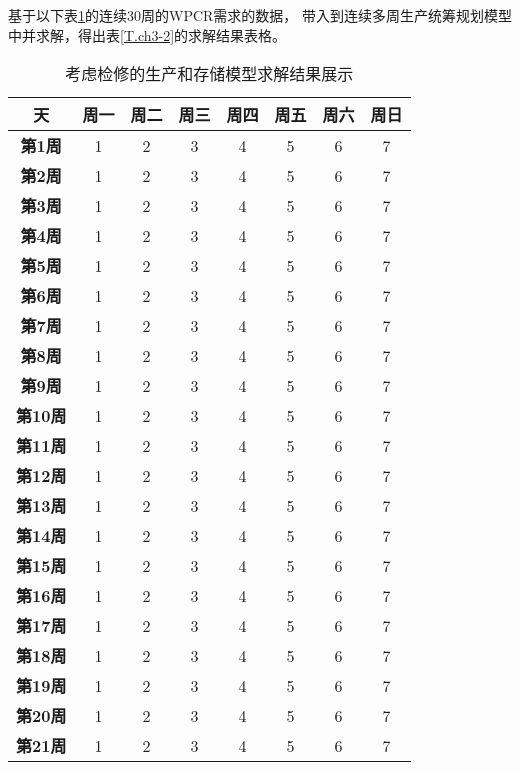 基于以下表\ref{T.ch3-1}的连续30周的WPCR需求的数据，
带入到连续多周生产统筹规划模型中并求解，得出表\ref{T.ch3-2}的求解结果表格。
\begin{table}[H]
    \renewcommand\arraystretch{1.5} 
    \centering
    \caption{考虑检修的生产和存储模型求解结果展示}
    \label{T.ch3-1}
    \xiaowu
    \begin{tabular}{|c|c|c|c|c|c|c|c|}
    \hline
    \textbf{天} & \textbf{周一} & \textbf{周二} & \textbf{周三} & \textbf{周四} & \textbf{周五} & \textbf{周六} & \textbf{周日} \\ \hline
    \textbf{第1周}  & 1 & 2 & 3 & 4 & 5 & 6 & 7 \\ \hline
    \textbf{第2周}  & 1 & 2 & 3 & 4 & 5 & 6 & 7 \\ \hline
    \textbf{第3周}  & 1 & 2 & 3 & 4 & 5 & 6 & 7 \\ \hline
    \textbf{第4周}  & 1 & 2 & 3 & 4 & 5 & 6 & 7 \\ \hline
    \textbf{第5周}  & 1 & 2 & 3 & 4 & 5 & 6 & 7 \\ \hline
    \textbf{第6周}  & 1 & 2 & 3 & 4 & 5 & 6 & 7 \\ \hline
    \textbf{第7周}  & 1 & 2 & 3 & 4 & 5 & 6 & 7 \\ \hline
    \textbf{第8周}  & 1 & 2 & 3 & 4 & 5 & 6 & 7 \\ \hline
    \textbf{第9周}  & 1 & 2 & 3 & 4 & 5 & 6 & 7 \\ \hline
    \textbf{第10周}  & 1 & 2 & 3 & 4 & 5 & 6 & 7 \\ \hline
    \textbf{第11周}  & 1 & 2 & 3 & 4 & 5 & 6 & 7 \\ \hline
    \textbf{第12周}  & 1 & 2 & 3 & 4 & 5 & 6 & 7 \\ \hline
    \textbf{第13周}  & 1 & 2 & 3 & 4 & 5 & 6 & 7 \\ \hline
    \textbf{第14周}  & 1 & 2 & 3 & 4 & 5 & 6 & 7 \\ \hline
    \textbf{第15周}  & 1 & 2 & 3 & 4 & 5 & 6 & 7 \\ \hline
    \textbf{第16周}  & 1 & 2 & 3 & 4 & 5 & 6 & 7 \\ \hline
    \textbf{第17周}  & 1 & 2 & 3 & 4 & 5 & 6 & 7 \\ \hline
    \textbf{第18周}  & 1 & 2 & 3 & 4 & 5 & 6 & 7 \\ \hline
    \textbf{第19周}  & 1 & 2 & 3 & 4 & 5 & 6 & 7 \\ \hline
    \textbf{第20周}  & 1 & 2 & 3 & 4 & 5 & 6 & 7 \\ \hline
    \textbf{第21周}  & 1 & 2 & 3 & 4 & 5 & 6 & 7 \\ \hline

\end{tabular}
\end{table}

